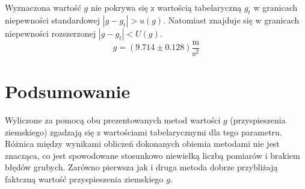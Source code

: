 \documentclass{fizraport}
\begin{document}
Wyznaczona wartość $g$ nie pokrywa się z wartością tabelaryczną $g_t$ w granicach niepewności standardowej $|g-g_t|>u(g)$. Natomiast znajduje się w granicach niepewności rozszerzonej $|g-g_t|<U(g)$.
\[ g=(9.714\pm0.128)\frac{\text{m}}{\text{s}^2}\] %
\section{Podsumowanie}
Wyliczone za pomocą obu prezentowanych metod wartości $g$ (przyspieszenia ziemskiego) zgadzają się z wartościami tabelarycznymi dla tego parametru. Różnica między wynikami obliczeń dokonanych obiemia metodami nie jest znacząca, co jest spowodowane stosunkowo niewielką liczbą pomiarów i brakiem błędów grubych.
Zarówno pierwsza jak i druga metoda dobrze przybliżają faktczną wartość przyspieszenia ziemskiego $g$.
\end{document}
